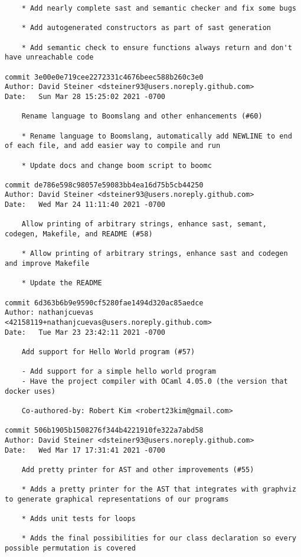 \documentclass{article}
\begin{document}
\begin{verbatim}
    * Add nearly complete sast and semantic checker and fix some bugs
    
    * Add autogenerated constructors as part of sast generation
    
    * Add semantic check to ensure functions always return and don't have unreachable code

commit 3e00e0e719cee2272331c4676beec588b260c3e0
Author: David Steiner <dsteiner93@users.noreply.github.com>
Date:   Sun Mar 28 15:25:02 2021 -0700

    Rename language to Boomslang and other enhancements (#60)
    
    * Rename language to Boomslang, automatically add NEWLINE to end of each file, and add easier way to compile and run
    
    * Update docs and change boom script to boomc

commit de786e598c98057e59083bb4ea16d75b5cb44250
Author: David Steiner <dsteiner93@users.noreply.github.com>
Date:   Wed Mar 24 11:11:40 2021 -0700

    Allow printing of arbitrary strings, enhance sast, semant, codegen, Makefile, and README (#58)
    
    * Allow printing of arbitrary strings, enhance sast and codegen and improve Makefile
    
    * Update the README

commit 6d363b6b9e9590cf5280fae1494d320ac85aedce
Author: nathanjcuevas <42158119+nathanjcuevas@users.noreply.github.com>
Date:   Tue Mar 23 23:42:11 2021 -0700

    Add support for Hello World program (#57)
    
    - Add support for a simple hello world program
    - Have the project compiler with OCaml 4.05.0 (the version that docker uses)
    
    Co-authored-by: Robert Kim <robert23kim@gmail.com>

commit 506b1905b1508276f344b4221910fe322a7abd58
Author: David Steiner <dsteiner93@users.noreply.github.com>
Date:   Wed Mar 17 17:31:41 2021 -0700

    Add pretty printer for AST and other improvements (#55)
    
    * Adds a pretty printer for the AST that integrates with graphviz to generate graphical representations of our programs
    
    * Adds unit tests for loops
    
    * Adds the final possibilities for our class declaration so every possible permutation is covered
    

\end{verbatim}
\end{document}
